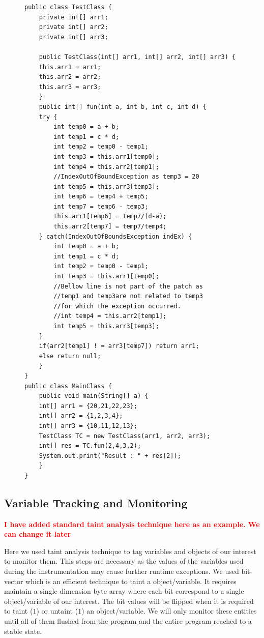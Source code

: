  

\lstset{language=Java, caption=patching code slice based on exception type,
label=patchingexample1}

\begin{figure}[t]
\begin{lstlisting}[countblanklines=false]
public class TestClass {
    private int[] arr1;
    private int[] arr2;
    private int[] arr3;

    public TestClass(int[] arr1, int[] arr2, int[] arr3) {
	this.arr1 = arr1;
	this.arr2 = arr2;
	this.arr3 = arr3;
    }
    public int[] fun(int a, int b, int c, int d) {
	try {
	    int temp0 = a + b;
	    int temp1 = c * d;
	    int temp2 = temp0 - temp1;
	    int temp3 = this.arr1[temp0];
	    int temp4 = this.arr2[temp1];
	    //IndexOutOfBoundException as temp3 = 20
	    int temp5 = this.arr3[temp3];
	    int temp6 = temp4 + temp5;
	    int temp7 = temp6 - temp3;
	    this.arr1[temp6] = temp7/(d-a);
	    this.arr2[temp7] = temp7/temp4;
	} catch(IndexOutOfBoundsException indEx) {
	    int temp0 = a + b;
	    int temp1 = c * d;
	    int temp2 = temp0 - temp1;
	    int temp3 = this.arr1[temp0];
	    //Bellow line is not part of the patch as
	    //temp1 and temp3are not related to temp3
	    //for which the exception occurred.
	    //int temp4 = this.arr2[temp1];
	    int temp5 = this.arr3[temp3];
	}
	if(arr2[temp1] ! = arr3[temp7]) return arr1;
	else return null;
    }
}
public class MainClass {
    public void main(String[] a) {
	int[] arr1 = {20,21,22,23};
	int[] arr2 = {1,2,3,4};
	int[] arr3 = {10,11,12,13};
	TestClass TC = new TestClass(arr1, arr2, arr3);
	int[] res = TC.fun(2,4,3,2);
	System.out.print("Result : " + res[2]);
    }    
}
\end{lstlisting}
\end{figure}

\subsection{Variable Tracking and Monitoring}
\label{subsec:taint}
\textcolor{red}{\textbf{I have added standard taint analysis technique here as
an example. We can change it later}}\newline


Here we used taint analysis technique to tag variables and objects of our
interest to monitor them.
This steps are necessary as the values of the variables used during the
instrumentation may cause further runtime exceptions.
We used bit-vector which is an efficient technique to taint a object/variable.
It requires maintain a single dimension byte array where each bit correspond to
a single object/variable of our interest.
The bit values will be flipped when it is required to taint ($1$) or untaint
($1$) an object/variable.
We will only monitor these entities until all of them flushed from the program
and the entire program reached to a stable state.